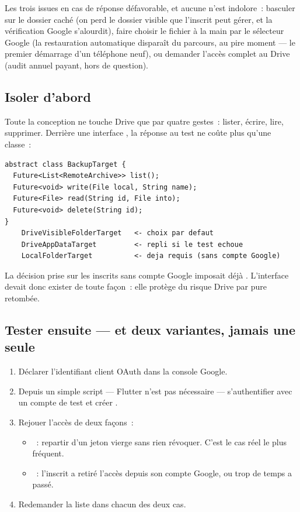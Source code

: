 \documentclass[11pt,a4paper,oneside]{report}
\begin{document}
Les trois issues en cas de réponse défavorable, et aucune n'est indolore~: basculer sur le
dossier caché (on perd le dossier visible que l'inscrit peut gérer, et la vérification Google
s'alourdit), faire choisir le fichier à la main par le sélecteur Google (la restauration
automatique disparaît du parcours, au pire moment --- le premier démarrage d'un téléphone
neuf), ou demander l'accès complet au Drive (audit annuel payant, hors de question).

\subsection{Isoler d'abord}

Toute la conception ne touche Drive que par quatre gestes~: lister, écrire, lire, supprimer.
Derrière une interface , la réponse au test ne coûte plus qu'une classe~:

\begin{lstlisting}[style=Alanya, language={}]
abstract class BackupTarget {
  Future<List<RemoteArchive>> list();
  Future<void> write(File local, String name);
  Future<File> read(String id, File into);
  Future<void> delete(String id);
}
    DriveVisibleFolderTarget   <- choix par defaut
    DriveAppDataTarget         <- repli si le test echoue
    LocalFolderTarget          <- deja requis (sans compte Google)
\end{lstlisting}

\begin{note}
La décision prise sur les inscrits sans compte Google imposait déjà .
L'interface devait donc exister de toute façon~: elle protège du risque Drive par pure
retombée.
\end{note}

\subsection{Tester ensuite --- et deux variantes, jamais une seule}

\begin{enumerate}[leftmargin=*]
  \item Déclarer l'identifiant client OAuth dans la console Google.
  \item Depuis un simple script --- Flutter n'est pas nécessaire --- s'authentifier avec un
        compte de test et créer .
  \item Rejouer l'accès de deux façons~:
    \begin{itemize}
      \item {}~: repartir d'un jeton vierge sans rien révoquer.
            C'est le cas réel le plus fréquent.
      \item {}~: l'inscrit a retiré l'accès depuis son
            compte Google, ou trop de temps a passé.
    \end{itemize}
  \item Redemander la liste dans chacun des deux cas.
\end{enumerate}
\end{document}
